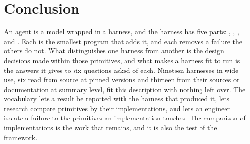 \section{Conclusion}
\label{sec:conclusion}

An agent is a model wrapped in a harness, and the harness has five parts: , , ,  and . Each is the smallest program that adds it, and each removes a failure the others do not. What distinguishes one harness from another is the design decisions made within those primitives, and what makes a harness fit to run is the answers it gives to six questions asked of each. Nineteen harnesses in wide use, six read from source at pinned versions and thirteen from their sources or documentation at summary level, fit this description with nothing left over. The vocabulary lets a result be reported with the harness that produced it, lets research compare primitives by their implementations, and lets an engineer isolate a failure to the primitives an implementation touches. The comparison of implementations is the work that remains, and it is also the test of the framework.
